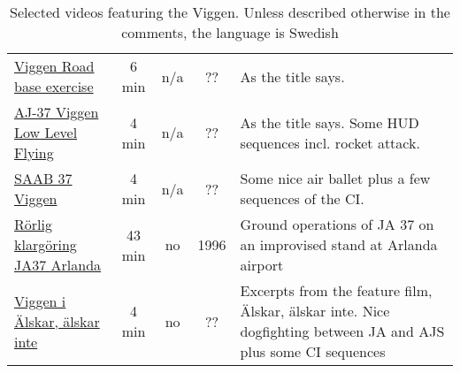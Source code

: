 \begin{landscape}
\begin{table}[!th]
\begin{tabular}{|p{5cm}|c|c|c|p{9cm}|}
\href{https://www.youtube.com/watch?v=slm9ksxU0HY}{Viggen Road base exercise} & 6 min & n/a & ?? & As the title says.\\
\href{https://www.youtube.com/watch?v=hWrsP3hq5M8}{AJ-37 Viggen Low Level Flying} & 4 min & n/a & ?? & As the title says. Some HUD sequences incl. rocket attack.\\
\href{https://www.youtube.com/watch?v=UOszNlNeRVs}{SAAB 37 Viggen} & 4 min & n/a & ?? & Some nice air ballet plus a few sequences of the CI.\\
\href{https://www.youtube.com/watch?v=IbsYsUvCy7s}{Rörlig klargöring JA37 Arlanda} & 43 min & no & 1996 & Ground operations of JA 37 on an improvised stand at Arlanda airport\\
\href{https://vimeo.com/60091080}{Viggen i Älskar, älskar inte} & 4 min & no & ?? & Excerpts from the feature film, Älskar, älskar inte. Nice dogfighting between JA and AJS plus some CI sequences\\

\hline
\end{tabular}
\caption{Selected videos featuring the Viggen. Unless described otherwise in the comments, the language is Swedish}
\end{table}

\end{landscape}



